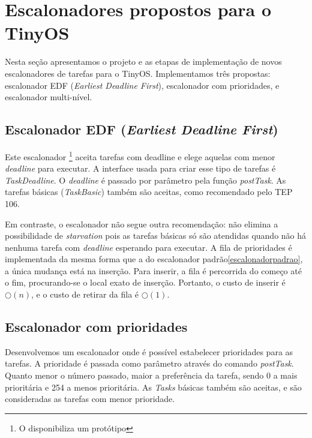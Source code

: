 \documentclass[a4paper,onecolumn, 10pt]{article}
\begin{document}
\section{Escalonadores propostos para o TinyOS}\label{escalonadorespropostos}
Nesta seção apresentamos o projeto e as etapas de implementação de novos escalonadores
de tarefas para o TinyOS.
Implementamos três propostas: escalonador EDF (\textit{Earliest Deadline First}), escalonador com prioridades,  
e escalonador multi-nível.

\subsection{Escalonador EDF (\textit{Earliest Deadline First})}\label{escalonadoredf}
Este escalonador \footnote{O \cite{TEP106} disponibiliza um protótipo} aceita tarefas com deadline e 
elege aquelas com menor \textit{deadline} para executar. A interface usada para criar
esse tipo de tarefas é \textit{TaskDeadline}. O \textit{deadline} é passado por parâmetro pela função \textit{postTask}.
As tarefas básicas (\textit{TaskBasic}) também são aceitas, como recomendado pelo TEP 106\cite{TEP106}.

Em contraste, o escalonador não segue outra recomendação: não elimina a possibilidade de 
\textit{starvation} pois as tarefas
básicas só são atendidas quando não há nenhuma tarefa com \textit{deadline} esperando para executar. 
A fila de prioridades é implementada da mesma forma que a do escalonador 
padrão\ref{escalonadorpadrao}, a única mudança está na inserção. Para
inserir, a fila é percorrida do começo até o fim, procurando-se o local exato de inserção.
Portanto, o custo de inserir é $\bigcirc(n)$, e o custo de retirar da fila é $\bigcirc(1)$. 


\subsection{Escalonador com prioridades}\label{escalonadorprioridade}
Desenvolvemos um escalonador onde é possível estabelecer prioridades para as tarefas. 
A prioridade é passada como parâmetro através 
do comando \textit{postTask}. Quanto menor o número passado, maior a preferência da tarefa, sendo 0 a
mais prioritária e 254 a menos prioritária.
As \textit{Tasks} básicas também são aceitas, e são consideradas as tarefas com menor prioridade.
\end{document}
